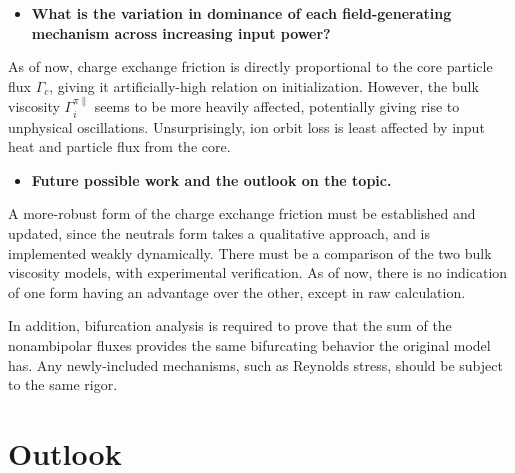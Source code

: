 \begin{itemize}
	\item \textbf{What is the variation in dominance of each field-generating mechanism across increasing input power?}
\end{itemize}

As of now, charge exchange friction is directly proportional to the core particle flux $\Gamma_c$, giving it artificially-high relation on initialization.
However, the bulk viscosity $\Gamma_i^{\pi\parallel}$ seems to be more heavily affected, potentially giving rise to unphysical oscillations.
Unsurprisingly, ion orbit loss is least affected by input heat and particle flux from the core.


\begin{itemize}
	\item \textbf{Future possible work and the outlook on the topic.}
\end{itemize}

A more-robust form of the charge exchange friction must be established and updated, since the neutrals form takes a qualitative approach, and is implemented weakly dynamically.
There must be a comparison of the two bulk viscosity models, with experimental verification.
As of now, there is no indication of one form having an advantage over the other, except in raw calculation.

In addition, bifurcation analysis is required to prove that the sum of the nonambipolar fluxes provides the same bifurcating behavior the original model has.
Any newly-included mechanisms, such as Reynolds stress, should be subject to the same rigor.

\section{Outlook} \label{sec:outlook}

